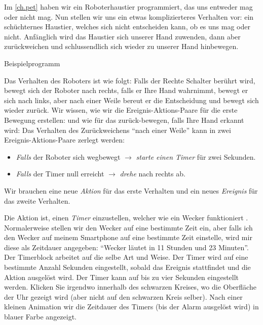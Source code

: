 \label{ch.time}

Im \cref{ch.pet} haben wir ein Roboterhaustier programmiert, das uns entweder mag oder nicht mag. Nun stellen wir uns ein etwas komplizierteres Verhalten vor: ein schüchternes Haustier, welches sich nicht entscheiden kann, ob es uns mag oder nicht. Anfänglich wird das Haustier sich unserer Hand zuwenden, dann aber zurückweichen und schlussendlich sich wieder zu unserer Hand hinbewegen.

{\raggedleft \hfill Beispielprogramm }

Das Verhalten des Roboters ist wie folgt: Falls der Rechte Schalter berührt wird, bewegt sich der Roboter nach rechts, falls er Ihre Hand wahrnimmt, bewegt er sich nach links, aber nach einer Weile bereut er die Entscheidung und bewegt sich wieder zurück. Wir wissen, wie wir die Ereignis-Aktions-Paare für die erste Bewegung erstellen:
und wie für das zurück-bewegen, falls Ihre Hand erkannt wird:
Das Verhalten des Zurückweichens ``nach einer Weile'' kann in zwei Ereignis-Aktions-Paare zerlegt werden:

\begin{itemize}

\item \emph{Falls} der Roboter sich wegbewegt $\rightarrow$
\emph{starte einen Timer} für zwei Sekunden.

\item \emph{Falls} der Timer null erreicht $\rightarrow$ \emph{drehe}
nach rechts ab.

\end{itemize}

Wir brauchen eine neue \emph{Aktion} für das erste Verhalten und ein neues \emph{Ereignis} für das zweite Verhalten.

Die Aktion ist, einen \emph{Timer} einzustellen, welcher wie ein Wecker funktioniert .  Normalerweise stellen wir den Wecker auf eine bestimmte Zeit ein, aber falls ich den Wecker auf meinem Smartphone auf eine bestimmte Zeit einstelle, wird mir diese als Zeitdauer angegeben: ``Wecker läutet in 11 Stunden und 23 Minuten''. Der Timerblock arbeitet auf die selbe Art und Weise. Der Timer wird auf eine bestimmte Anzahl Sekunden eingestellt, sobald das Ereignis stattfindet und die Aktion ausgelöst wird. Der Timer kann auf bis zu vier Sekunden eingestellt werden. Klicken Sie irgendwo innerhalb des schwarzen Kreises, wo die Oberfläche der Uhr gezeigt wird (aber nicht auf den schwarzen Kreis selber). Nach einer kleinen Animation wir die Zeitdauer des Timers (bis der Alarm ausgelöst wird) in blauer Farbe angezeigt.

